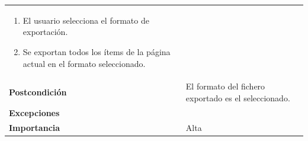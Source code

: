 \documentclass[
]{article}
\providecommand{\tightlist}{%
  \setlength{\itemsep}{0pt}\setlength{\parskip}{0pt}}
\begin{document}
\begin{longtable}[]{@{}ll@{}}
\begin{minipage}[t]{0.71\columnwidth}
\begin{enumerate}
\tightlist
\item
  El usuario selecciona el formato de exportación.
\item
  Se exportan todos los ítems de la página actual en el formato
  seleccionado.
\end{enumerate}\strut
\end{minipage}\tabularnewline
\begin{minipage}[t]{0.23\columnwidth}\raggedright
\textbf{Postcondición}\strut
\end{minipage} & \begin{minipage}[t]{0.71\columnwidth}\raggedright
El formato del fichero exportado es el seleccionado.\strut
\end{minipage}\tabularnewline
\begin{minipage}[t]{0.23\columnwidth}\raggedright
\textbf{Excepciones}\strut
\end{minipage} & \begin{minipage}[t]{0.71\columnwidth}\raggedright
\strut
\end{minipage}\tabularnewline
\begin{minipage}[t]{0.23\columnwidth}\raggedright
\textbf{Importancia}\strut
\end{minipage} & \begin{minipage}[t]{0.71\columnwidth}\raggedright
Alta\strut
\end{minipage}\tabularnewline
\bottomrule
\end{longtable}
\end{document}
